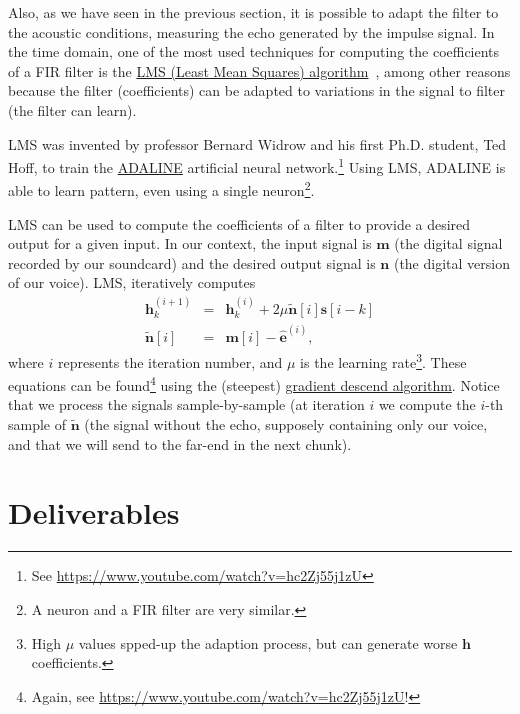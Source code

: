 Also, as we have seen in the previous section, it is possible to adapt
the filter to the acoustic conditions, measuring the echo generated by
the impulse signal. In the time domain, one of the most used
techniques for computing the coefficients of a FIR filter is the
\href{https://en.wikipedia.org/wiki/Least_mean_squares_filter}{LMS
  (Least Mean Squares)
  algorithm}~\cite{haykin1995adaptive,boyd2004convex}, among other
reasons because the filter (coefficients) can be adapted to variations
in the signal to filter (the filter can learn).

LMS was invented by professor Bernard Widrow and his first
Ph.D. student, Ted Hoff, to train the
\href{https://en.wikipedia.org/wiki/ADALINE}{ADALINE} artificial
neural network.\footnote{See
  \url{https://www.youtube.com/watch?v=hc2Zj55j1zU}} Using LMS,
ADALINE is able to learn pattern, even using a single
neuron\footnote{A neuron and a FIR filter are very similar.}.

LMS can be used to compute the coefficients of a filter to provide a
desired output for a given input. In our
context, the input signal is ${\mathbf m}$ (the digital signal
recorded by our soundcard) and the desired output signal is
${\mathbf n}$ (the digital version of our voice). LMS, iteratively
computes
\begin{eqnarray}
  {\mathbf h}^{(i+1)}_k & = & {\mathbf h}^{(i)}_k + 2\mu\tilde{\mathbf n}[i]{\mathbf s}[i-k] \\
  \tilde{\mathbf n}[i] & = & {\mathbf m}[i] - \hat{\mathbf e}^{(i)},
\end{eqnarray}
where $i$ represents the iteration number, and $\mu$ is the learning
rate\footnote{High $\mu$ values spped-up the adaption process, but can
generate worse ${\mathbf h}$ coefficients.}. These equations can be
found\footnote{Again, see
\url{https://www.youtube.com/watch?v=hc2Zj55j1zU}!} using the
(steepest)
\href{https://en.wikipedia.org/wiki/Gradient_descent}{gradient descend
  algorithm}. Notice that we process the signals sample-by-sample (at
iteration $i$ we compute the $i$-th sample of $\tilde{\mathbf n}$ (the
signal without the echo, supposely containing only our voice, and that
we will send to the far-end in the next chunk).

\section{Deliverables}

